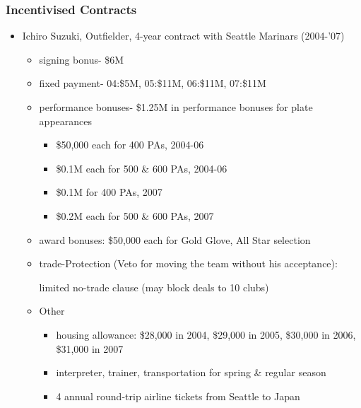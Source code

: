 \documentclass[dvipdfmx,12pt]{beamer}
\begin{document}
\begin{frame}\frametitle{Incentivised Contracts}
    \begin{itemize}
      \footnotesize
      \item Ichiro Suzuki, Outfielder, 4-year contract with Seattle Marinars (2004-'07)
      \begin{itemize}
        \footnotesize
        \item signing bonus- \$6M

        \item fixed payment- 04:\$5M, 05:\$11M, 06:\$11M, 07:\$11M

        \item performance bonuses- \$1.25M in performance bonuses for plate appearances

        \begin{itemize}
          \footnotesize
          \item \$50,000 each for 400 PAs, 2004-06

          \item \$0.1M each for 500 \& 600 PAs, 2004-06

          \item \$0.1M for 400 PAs, 2007

          \item \$0.2M each for 500 \& 600 PAs, 2007
        \end{itemize}

        \item award bonuses: \$50,000 each for Gold Glove, All Star selection

        \item trade-Protection (Veto for moving the team without his acceptance):

        limited no-trade clause (may block deals to 10 clubs)

        \item Other

        \begin{itemize}
          \footnotesize
          \item housing allowance: \$28,000 in 2004, \$29,000 in 2005, \$30,000 in 2006, \$31,000 in 2007

          \item interpreter, trainer, transportation for spring \& regular season

          \item 4 annual round-trip airline tickets from Seattle to Japan
        \end{itemize}
      \end{itemize}
    \end{itemize}
\end{frame}
\end{document}
